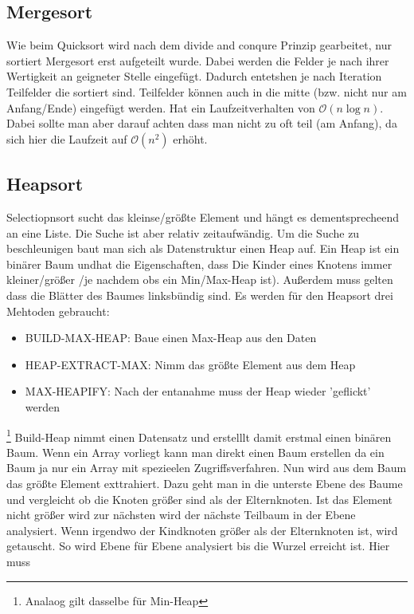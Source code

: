 \documentclass[a4paper]{scrartcl}
\begin{document}
        \subsection{Mergesort}
            Wie beim Quicksort wird nach dem divide and conqure Prinzip gearbeitet, nur sortiert Mergesort erst aufgeteilt wurde. Dabei werden die Felder je nach 
            ihrer Wertigkeit an geigneter Stelle eingefügt. Dadurch entetshen je nach Iteration Teilfelder die sortiert sind. Teilfelder können auch 
            in die mitte (bzw. nicht nur am Anfang/Ende) eingefügt werden. Hat ein Laufzeitverhalten von \(\mathcal{O}(n \log n)\). Dabei sollte man 
            aber darauf achten dass man nicht zu oft teil (am Anfang), da sich hier die Laufzeit auf \(\mathcal{O}(n^2)\) erhöht.
        \subsection{Heapsort}
            Selectiopnsort sucht das kleinse/größte Element und hängt es dementsprecheend an eine Liste. Die Suche ist aber relativ zeitaufwändig. Um die 
            Suche zu beschleunigen baut man sich als Datenstruktur einen Heap auf. Ein Heap ist ein binärer Baum undhat die Eigenschaften, dass Die Kinder 
            eines Knotens immer kleiner/größer /je nachdem obs ein Min/Max-Heap ist). Außerdem muss gelten dass die Blätter des Baumes linksbündig sind.
            Es werden für den Heapsort drei Mehtoden gebraucht:
            \begin{itemize}
                \item BUILD-MAX-HEAP: Baue einen Max-Heap aus den Daten
                \item HEAP-EXTRACT-MAX: Nimm das größte Element aus dem Heap
                \item MAX-HEAPIFY: Nach der entanahme muss der Heap wieder 'geflickt' werden
            \end{itemize} \footnote{Analaog gilt dasselbe für Min-Heap}
            Build-Heap nimmt einen Datensatz und erstelllt damit erstmal einen binären Baum. Wenn ein Array vorliegt kann man direkt einen Baum erstellen
            da ein Baum ja nur ein Array mit spezieelen Zugriffsverfahren. Nun wird aus dem Baum das größte Element exttrahiert. Dazu geht man in die unterste Ebene
            des Baume und vergleicht ob die Knoten größer sind als der Elternknoten. Ist das Element nicht größer wird zur nächsten wird der nächste Teilbaum in der Ebene
            analysiert. Wenn irgendwo der Kindknoten größer als der Elternknoten ist, wird getauscht. So wird Ebene für Ebene analysiert bis die Wurzel erreicht ist. Hier muss
\end{document}
